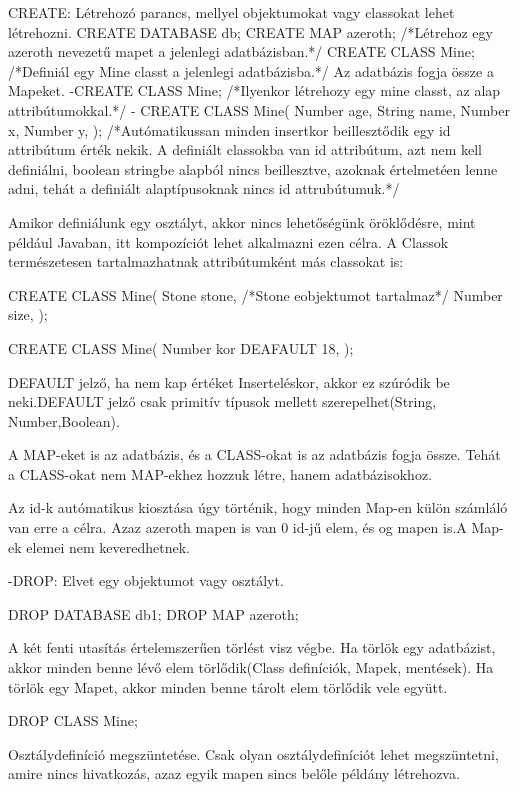 \begin{sql}
CREATE: Létrehozó parancs, mellyel objektumokat vagy classokat lehet létrehozni.
CREATE DATABASE db;
CREATE MAP azeroth; /*Létrehoz egy azeroth nevezetű mapet a jelenlegi adatbázisban.*/
CREATE CLASS Mine; /*Definiál egy Mine classt a jelenlegi adatbázisba.*/
Az adatbázis fogja össze a Mapeket. 
-CREATE CLASS Mine; /*Ilyenkor létrehozy egy mine classt, az alap attribútumokkal.*/
- CREATE CLASS Mine(
	Number age,
	String name,
	Number x,
	Number y,
);  /*Autómatikussan minden insertkor beillesztődik egy id attribútum érték nekik. A definiált classokba van id attribútum, azt nem kell definiálni, boolean stringbe alapból nincs beillesztve, azoknak értelmetéen lenne adni, tehát a definiált alaptípusoknak nincs id attrubútumuk.*/

Amikor definiálunk egy osztályt, akkor nincs lehetőségünk öröklődésre, mint például Javaban, itt kompozíciót lehet alkalmazni ezen célra.
A Classok természetesen tartalmazhatnak attribútumként más classokat is:

\begin{sql}
CREATE CLASS Mine(
	Stone stone,  /*Stone eobjektumot tartalmaz*/
	Number size,
);

CREATE CLASS Mine(
	Number kor DEAFAULT 18,
);
\end{sql}

DEFAULT jelző, ha nem kap értéket Inserteléskor, akkor ez szúródik be neki.DEFAULT jelző csak primitív típusok mellett szerepelhet(String, Number,Boolean).

A MAP-eket is az adatbázis, és a CLASS-okat is az adatbázis fogja össze. Tehát a CLASS-okat nem MAP-ekhez hozzuk létre, hanem adatbázisokhoz.

Az id-k autómatikus kiosztása úgy történik, hogy minden Map-en külön számláló van erre a célra. Azaz azeroth mapen is van 0 id-jű elem, és og mapen is.A Map-ek elemei nem keveredhetnek.


-DROP: Elvet egy objektumot vagy osztályt.
\begin{sql}
DROP DATABASE db1;
DROP MAP azeroth;
\end{sql}
A két fenti utasítás értelemszerűen törlést visz végbe. Ha törlök egy adatbázist, akkor minden benne lévő elem törlődik(Class definíciók, Mapek, mentések).
Ha törlök  egy Mapet, akkor minden benne tárolt elem törlődik vele együtt.

\begin{sql}
DROP CLASS Mine;
\end{sql}
Osztálydefiníció megszüntetése. Csak olyan osztálydefiníciót lehet megszüntetni, amire nincs hivatkozás, azaz egyik mapen sincs belőle példány létrehozva.


\end{sql}
